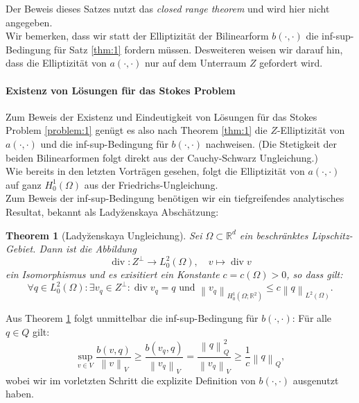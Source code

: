 \message{ !name(script.tex)}\documentclass[a4paper]{scrartcl}
\newcommand{\real}{\mathbb{R}}
\newcommand{\Hzero}{H_0^1}
\newcommand{\Ltwo}{L^2}
\newcommand{\vnorm}[1]{\left\lVert#1\right\rVert_V}
\newcommand{\norm}[1]{\left\lVert#1\right\rVert}
\DeclareMathOperator{\divOp}{div}
\theoremstyle{plain}
\newtheorem{theorem}{Theorem}
\theoremstyle{definition}
\theoremstyle{remark}
\begin{document}
\noindent Der Beweis dieses Satzes nutzt das \emph{closed range theorem} und
wird hier nicht angegeben. \\
Wir bemerken, dass wir statt der Elliptizität der Bilinearform \(b(\cdot,
\cdot)\) die inf-sup-Bedingung für Satz \ref{thm:1} fordern
müssen. Desweiteren weisen wir darauf hin, dass die Elliptizität von
\(a(\cdot, \cdot)\) nur auf dem Unterraum \(Z\) gefordert wird. \\


\paragraph{Existenz von Lösungen für das Stokes Problem}
\label{sec:exist-von-losung}

Zum Beweis der Existenz und Eindeutigkeit von Lösungen für das Stokes
Problem \ref{problem:1} genügt es also nach Theorem \ref{thm:1} die
\(Z\)-Elliptizität von \(a(\cdot, \cdot)\) und die 
inf-sup-Bedingung für \(b(\cdot, \cdot)\) nachweisen. (Die Stetigkeit
der beiden Bilinearformen folgt direkt aus der Cauchy-Schwarz
Ungleichung.)\\

\noindent Wie bereits in den letzten Vorträgen gesehen, folgt die
Elliptizität von \(a(\cdot, \cdot)\) auf ganz \(\Hzero(\Omega)\) aus der Friedrichs-Ungleichung. \\ 
Zum Beweis der inf-sup-Bedingung benötigen wir ein tiefgreifendes
analytisches Resultat, bekannt als Lady\u{z}enskaya Abschätzung: 

\begin{theorem}[Lady\u{z}enskaya Ungleichung] \label{thm:2}
  Sei \(\Omega \subset \real^d\) ein beschränktes
  Lipschitz-Gebiet. Dann ist die Abbildung 
  \[\divOp \colon Z^\perp \rightarrow \Ltwo_0(\Omega), \quad v \mapsto
  \divOp v\]
  ein Isomorphismus und es exisitiert ein Konstante \(c = c(\Omega) >
  0\), so dass gilt: 
  \[\forall q \in \Ltwo_0(\Omega)\colon \exists v_q \in Z^\perp \colon 
  \divOp v_q = q \text{ und } \norm{v_q}_{\Hzero(\Omega; \real^2)} \leq c \norm{q}_{\Ltwo(\Omega)}.\]
\end{theorem}

\noindent Aus Theorem \ref{thm:2} folgt unmittelbar die
inf-sup-Bedingung für \(b(\cdot, \cdot)\): Für alle \(q\in Q\) gilt: 
\begin{equation}
  \label{eq:8}
  \sup_{v\in V} \frac{b(v,q)}{\vnorm{v}} \geq \frac{b(v_q,q)}{\vnorm{v_q}} = \frac{\norm{q}^2_Q}{\vnorm{v_q}} \geq \frac{1}{c} \norm{q}_Q,  
\end{equation}
wobei wir im vorletzten Schritt die explizite Definition von
\(b(\cdot, \cdot)\)  ausgenutzt haben. \\
\end{document}
